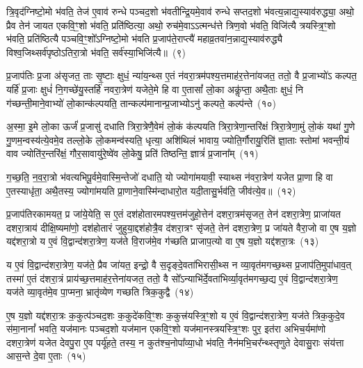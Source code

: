 त्रि॒वृद॑ग्निष्टो॒मो भ॑वति॒ तेज॑ ए॒वाव॑ रुन्धे पञ्चद॒शो भ॑वतीन्द्रि॒यमे॒वाव॑ रुन्धे सप्तद॒शो भ॑वत्य॒न्नाद्य॒स्याव॑रुद्ध्या॒ अथो॒ प्रैव तेन॑ जायत एकवि॒ꣳ॒शो भ॑वति॒ प्रति॑ष्ठित्या॒ अथो॒ रुच॑मे॒वा\-ऽऽ\-त्मन्ध॑त्ते त्रिण॒वो भ॑वति॒ विजि॑त्यै त्रयस्त्रि॒ꣳ॒शो भ॑वति॒ प्रति॑ष्ठित्यै पञ्चवि॒ꣳ॒शो᳚\-ऽग्निष्टो॒मो भ॑वति प्र॒जा\-प॑ते॒राप्त्यै॑ महाव्र॒तवा॑न॒न्नाद्य॒स्याव॑रुद्ध्यै विश्व॒जिथ्सर्व॑पृष्ठो\-ऽतिरा॒त्रो भ॑वति॒ सर्व॑स्या॒भिजि॑त्यै॥~(९)

{}%

प्र॒जा\-प॑तिः प्र॒जा अ॑सृजत॒ ताः सृ॒ष्टाः क्षुधं॒ न्या॑य॒न्थ्स ए॒तं न॑वरा॒त्रम॑पश्य॒त्तमाह॑र॒त्तेना॑यजत॒ ततो॒ वै प्र॒जाभ्यो॑\-ऽ कल्पत॒ यर्\mbox{}हि॑ प्र॒जाः क्षुधं॑ नि॒गच्छे॑यु॒स्तर्\mbox{}हि॑ नवरा॒त्रेण॑ यजेते॒मे हि वा ए॒तासां᳚ लो॒का अकॢ॑प्ता॒ अथै॒ताः क्षुधं॒ नि ग॑च्छन्ती॒माने॒वाभ्यो॑ लो॒कान्क॑ल्पयति॒ तान्कल्प॑मानान्प्र॒जाभ्यो\-ऽनु॑ कल्पते॒ कल्प॑न्ते~(१०)

अ॒स्मा॒ इ॒मे लो॒का ऊर्जं॑ प्र॒जासु॑ दधाति त्रिरा॒त्रेणै॒वेमं लो॒कं क॑ल्पयति त्रिरा॒त्रेणा॒न्तरि॑क्षं त्रिरा॒त्रेणा॒मुं लो॒कं यथा॑ गु॒णे गु॒णम॒न्वस्य॑त्ये॒वमे॒व तल्लो॒के लो॒कमन्व॑स्यति॒ धृत्या॒ अशि॑थिलं भावाय॒ ज्योति॒र्गौरायु॒रिति॑ ज्ञा॒ताः स्तोमा॑ भवन्ती॒यं वाव ज्योति॑र॒न्तरि॑क्षं॒ गौर॒सावायु॑रे॒ष्वे॑व लो॒केषु॒ प्रति॑ तिष्ठन्ति॒ ज्ञात्रं॑ प्र॒जाना᳚म्~(११)

ग॒च्छ॒ति॒ न॒व॒रा॒त्रो भ॑वत्यभिपू॒र्वमे॒वास्मि॒न्तेजो॑ दधाति॒ यो ज्योगा॑मयावी॒ स्याथ्स न॑वरा॒त्रेण॑ यजेत प्रा॒णा हि वा ए॒तस्याधृ॑ता॒ अथै॒तस्य॒ ज्योगा॑मयति प्रा॒णाने॒वास्मि॑न्दाधारो॒त यदी॒तासु॒र्भव॑ति॒ जीव॑त्ये॒व॥~(१२)

{\anuvakamend[{कल्प॑न्ते प्र॒जाना॒न्त्रय॑स्त्रिꣳशच्च}]}%

प्र॒जा\-प॑तिरकामयत॒ प्र जा॑ये॒येति॒ स ए॒तं दश॑होतारमपश्य॒त्तम॑जुहो॒त्तेन॑ दशरा॒त्रम॑सृजत॒ तेन॑ दशरा॒त्रेण॒ प्राजा॑यत दशरा॒त्राय॑ दीक्षि॒ष्यमा॑णो॒ दश॑होतारं जुहुया॒द्दश॑होत्रै॒व द॑शरा॒त्रꣳ सृ॑जते॒ तेन॑ दशरा॒त्रेण॒ प्र जा॑यते वैरा॒जो वा ए॒ष य॒ज्ञो यद्द॑शरा॒त्रो य ए॒वं वि॒द्वान्द॑शरा॒त्रेण॒ यज॑ते वि॒राज॑मे॒व ग॑च्छति प्राजाप॒त्यो वा ए॒ष य॒ज्ञो यद्द॑शरा॒त्रः~(१३)

य ए॒वं वि॒द्वान्द॑शरा॒त्रेण॒ यज॑ते॒ प्रैव जा॑यत॒ इन्द्रो॒ वै स॒दृङ्दे॒वता॑भिरासी॒थ्स न व्या॒वृत॑मगच्छ॒थ्स प्र॒जा\-प॑ति॒मुपा॑धाव॒त् तस्मा॑ ए॒तं द॑शरा॒त्रं प्राय॑च्छ॒त्तमाह॑र॒त्तेना॑यजत॒ ततो॒ वै सो᳚\-ऽन्याभि॑र्दे॒वता॑भिर्व्या॒वृत॑मगच्छ॒द्य ए॒वं वि॒द्वान्द॑शरा॒त्रेण॒ यज॑ते व्या॒वृत॑मे॒व पा॒प्मना॒ भ्रातृ॑व्येण गच्छति त्रिक॒कुद्वै~(१४)

ए॒ष य॒ज्ञो यद्द॑शरा॒त्रः क॒कुत्प॑ञ्चद॒शः क॒कुदे॑कवि॒ꣳ॒शः क॒कुत्त्र॑यस्त्रि॒ꣳ॒शो य ए॒वं वि॒द्वान्द॑शरा॒त्रेण॒ यज॑ते त्रिक॒कुदे॒व स॑मा॒नानां᳚ भवति॒ यज॑मानः पञ्चद॒शो यज॑मान एकवि॒ꣳ॒शो यज॑मानस्त्रयस्त्रि॒ꣳ॒शः पुर॒ इत॑रा अभिच॒र्यमा॑णो दशरा॒त्रेण॑ यजेत देवपु॒रा ए॒व पर्यू॑हते॒ तस्य॒ न कुत॑श्च॒नोपा᳚व्या॒धो भ॑वति॒ नैन॑मभि॒चर᳚न्थ्स्तृणुते देवासु॒राः संय॑त्ता आस॒न्ते दे॒वा ए॒ताः~(१५)

